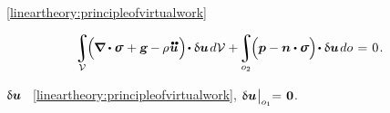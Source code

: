 \vspace{-0.4em}\noindent
{}~\eqref{lineartheory:principleofvirtualwork}

\nopagebreak\vspace{-0.4em}
\begin{equation*}
\displaystyle\integral\displaylimits_{\mathcal{V}} \hspace{-0.4ex} \Bigl( \hspace{-0.1ex} \boldnabla \dotp \linearstress \hspace{.1ex} + \volumeloadvector \hspace{-0.1ex} - \hspace{-0.1ex} \rho \hspace{.1ex} \mathdotdotabove{\bm{u}} \hspace{.1ex} \Bigr) \hspace{-0.3ex} \dotp \variation{\bm{u}} \hspace{.25ex} d\mathcal{V}
+ \hspace{-0.3ex}
\displaystyle\integral\displaylimits_{o_2} \hspace{-0.4ex} \Bigl( \bm{p} - \unitnormalvector \dotp \linearstress \Bigr) \hspace{-0.3ex} \dotp \variation{\bm{u}} \hspace{.25ex} do
\hspace{.2ex} = \hspace{.2ex} 0
\hspace{.2ex} .
\end{equation*}

\vspace{-0.4em}\noindent
{}\en{,}
~$\updelta\hspace{-0.1ex}\bm{u}$
~\eqref{lineartheory:principleofvirtualwork},
${ \updelta\hspace{-0.1ex}\bm{u} \hspace{.1ex} \bigr|_{o_1} \hspace{-0.64ex} = \hspace{.2ex} {\bm{0}} }$.
